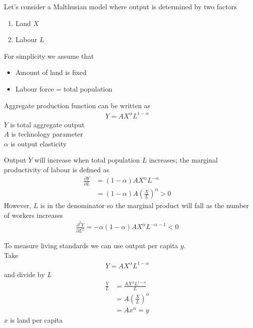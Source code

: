 \documentclass{beamer}
\begin{document}
\begin{frame}
 Let's consider a Malthusian model where output is determined by two factors 
 \begin{enumerate}
   \item Land $X$
   \item Labour $L$
 \end{enumerate}
 \medskip
 For simplicity we assume that
 \begin{itemize}
   \item Amount of land is fixed
   \item Labour force = total population
 \end{itemize} 
\end{frame}

\begin{frame}
  Aggregate production function can be written as  
  \begin{align}
    Y=AX^{\alpha}L^{1-\alpha}
  \end{align}
  \medskip
  $Y$ is total aggregate output\\
  $A$ is technology parameter\\
  $\alpha$ is output elasticity
\end{frame}

\begin{frame}
  Output $Y$ will increase when total population $L$ increases; the marginal productivity of labour is defined as
  \begin{align}
    \frac{\partial Y}{\partial L} &= (1-\alpha)AX^{\alpha}L^{-\alpha}\\
  &= (1-\alpha)A \left( \frac{X}{L} \right)^{\alpha} > 0
  \end{align}  
  \medskip
  However, $L$ is in the denominator so the marginal product will fall as the number of workers increases
  \begin{align}
    \frac{\partial^2Y}{\partial L^2} = -\alpha(1-\alpha)AX^{\alpha}L^{-\alpha-1}<0
  \end{align}
\end{frame}


\begin{frame}
  To measure living standards we can use output per capita $y$.\\  
  Take 
  \begin{align}
    Y=AX^{\alpha}L^{1-\alpha}
  \end{align}
  and divide by $L$
  \begin{align}
    \frac{Y}{L} &= \frac{AX^{\alpha}L^{1-\alpha}}{L}\\ \nonumber
    &= A\left ( \frac{X}{L} \right)^{\alpha} \\ \nonumber
    &= Ax^{\alpha} = y
  \end{align}
  $x$ is land per capita
\end{frame}
\end{document}
